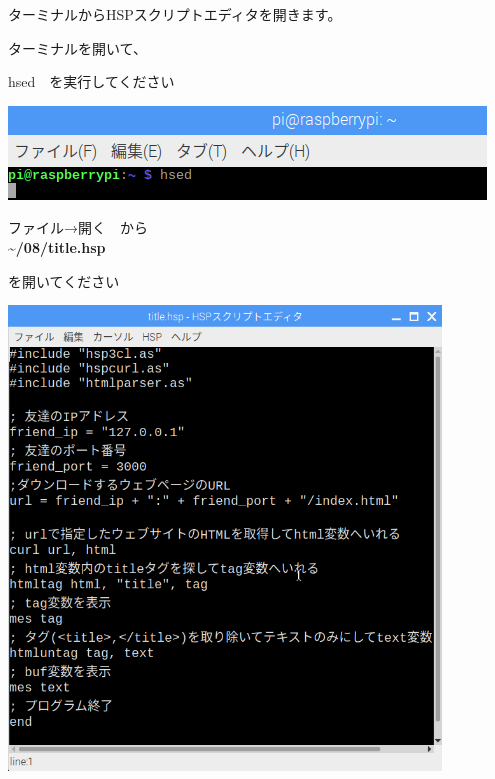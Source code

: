ターミナルからHSPスクリプトエディタを開きます。

ターミナルを開いて、

hsed　を実行してください



\begin{center}
\includegraphics[width=\textwidth]{./text08-img/textbook-img013.png}

\end{center}

\clearpage

ファイル→開く　から\\
\textbf{{\textasciitilde}/08/title.hsp}

を開いてください



\begin{center}
\includegraphics[width=11.472cm]{./text08-img/textbook-img014.png}

\end{center}

\bigskip


